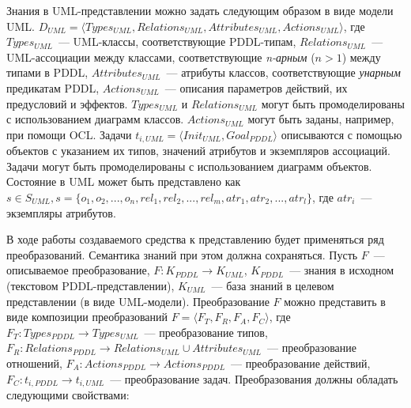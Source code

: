 \documentclass[a4paper,14pt]{extreport}
\begin{document}
    Знания в UML-представлении можно задать следующим образом в виде модели UML.  $D_{UML} = \langle Types_{UML}, Relations_{UML}, Attributes_{UML}, Actions_{UML} \rangle$, где $Types_{UML}$~--- UML-классы, соответствующие PDDL-типам, $Relations_{UML}$~--- UML-ассоциации между классами, соответствующие \textit{n-арным} ($n > 1$) между типами в PDDL, $Attributes_{UML}$~--- атрибуты классов, соответствующие \textit{унарным} предикатам PDDL, $Actions_{UML}$~--- описания параметров действий, их предусловий и эффектов. $Types_{UML}$ и $Relations_{UML}$ могут быть промоделированы с использованием диаграмм классов. $Actions_{UML}$ могут быть заданы, например, при помощи OCL. Задачи  $t_{i, UML} = \langle Init_{UML}, Goal_{PDDL} \rangle$ описываются с помощью объектов с указанием их типов, значений атрибутов и экземпляров ассоциаций. Задачи могут быть промоделированы с использованием диаграмм объектов. Состояние в UML может быть представлено как $ s \in S_{UML}, s = \{o_1, o_2, ..., o_n, rel_1, rel_2, ..., rel_m, atr_1, atr_2, ..., atr_l\}$, где $atr_i$~--- экземпляры атрибутов.
    
    В ходе работы создаваемого средства к представлению будет применяться ряд преобразований. Семантика знаний при этом должна сохраняться. Пусть $F$~--- описываемое преобразование, $F: K_{PDDL} \to K_{UML}$, $K_{PDDL}$~--- знания в исходном (текстовом PDDL-представлении), $K_{UML}$~--- база знаний в целевом представлении (в виде UML-модели). Преобразование $F$ можно представить в виде композиции преобразований $F = \langle F_T, F_R, F_A, F_C \rangle$, где $F_T: Types_{PDDL} \rightarrow Types_{UML}$~--- преобразование типов, $F_R: Relations_{PDDL} \rightarrow Relations_{UML} \cup Attributes_{UML}$~--- преобразование отношений, $F_A: Actions_{PDDL} \rightarrow Actions_{PDDL}$~--- преобразование действий, $F_C: t_{i, PDDL} \rightarrow t_{i, UML}$~--- преобразование задач. Преобразования должны обладать следующими свойствами:
    
\end{document}
